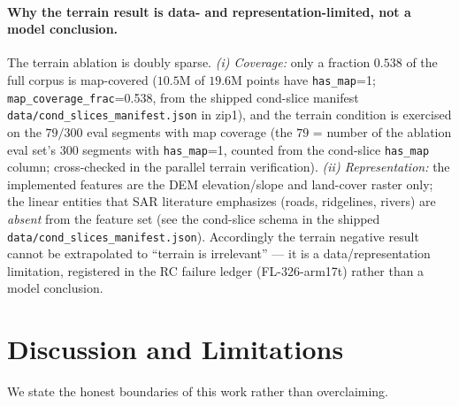\documentclass[11pt]{article}
\begin{document}
\paragraph{Why the terrain result is data- and representation-limited, not a model
conclusion.}
The terrain ablation is doubly sparse. \emph{(i) Coverage:} only a fraction
$0.538$ of the full corpus is map-covered ($10.5$M of $19.6$M points have
\texttt{has\_map}=1; \texttt{map\_coverage\_frac}=0.538, from the shipped cond-slice
manifest \texttt{data/cond\_slices\_manifest.json} in zip1), and the terrain condition
is exercised on the $79/300$ eval segments with map coverage (the $79$ = number of the
ablation eval set's $300$ segments with \texttt{has\_map}=1, counted from the
cond-slice \texttt{has\_map} column; cross-checked in the parallel terrain
verification). \emph{(ii) Representation:} the implemented features are the DEM
elevation/slope and land-cover raster only; the linear entities that SAR literature
emphasizes (roads, ridgelines, rivers) are \emph{absent} from the feature set (see the
cond-slice schema in the shipped \texttt{data/cond\_slices\_manifest.json}). Accordingly
the terrain negative result cannot be extrapolated to ``terrain is irrelevant'' --- it is
a data/representation limitation, registered in the RC failure ledger (FL-326-arm17t)
rather than a model conclusion.

\section{Discussion and Limitations}
\label{sec:discussion}
We state the honest boundaries of this work rather than overclaiming.
\end{document}
